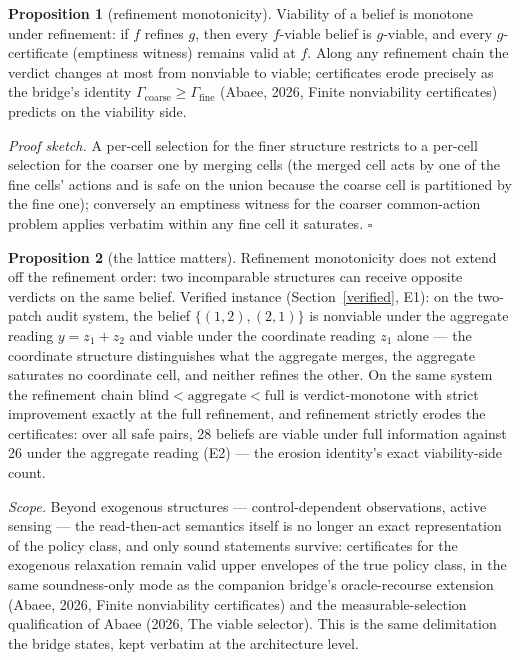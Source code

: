 \documentclass[10pt,twocolumn]{article}
\theoremstyle{definition}
\newtheorem{proposition}{Proposition}
\begin{document}
\begin{proposition}[refinement monotonicity]\label{prop:mono}
Viability of a belief is monotone under refinement: if \(f\) refines
\(g\), then every \(f\)-viable belief is \(g\)-viable, and every
\(g\)-certificate (emptiness witness) remains valid at \(f\). Along any
refinement chain the verdict changes at most from nonviable to viable;
certificates erode precisely as the bridge's identity
\(\Gamma_{\mathrm{coarse}} \ge \Gamma_{\mathrm{fine}}\) (Abaee, 2026, Finite nonviability certificates)
predicts on the viability side.
\end{proposition}

\emph{Proof sketch.} A per-cell selection for the finer structure
restricts to a per-cell selection for the coarser one by merging cells
(the merged cell acts by one of the fine cells' actions and is safe on the
union because the coarse cell is partitioned by the fine one); conversely
an emptiness witness for the coarser common-action problem applies verbatim
within any fine cell it saturates. \hfill\(\square\)

\begin{proposition}[the lattice matters]\label{prop:lattice}
Refinement monotonicity does not extend off the refinement order: two
incomparable structures can receive opposite verdicts on the same belief.
Verified instance (Section~\ref{verified}, E1): on the two-patch audit
system, the belief \(\{(1,2), (2,1)\}\) is nonviable under the aggregate
reading \(y = z_{1} + z_{2}\) and viable under the coordinate reading
\(z_{1}\) alone --- the coordinate structure distinguishes what the
aggregate merges, the aggregate saturates no coordinate cell, and neither
refines the other. On the same system the refinement chain
\(\mathrm{blind} < \mathrm{aggregate} < \mathrm{full}\) is verdict-monotone
with strict improvement exactly at the full refinement, and refinement
strictly erodes the certificates: over all safe pairs, 28 beliefs are
viable under full information against 26 under the aggregate reading
(E2) --- the erosion identity's exact viability-side count.
\end{proposition}

\emph{Scope.} Beyond exogenous structures --- control-dependent
observations, active sensing --- the read-then-act semantics itself is no
longer an exact representation of the policy class, and only sound
statements survive: certificates for the exogenous relaxation remain valid
upper envelopes of the true policy class, in the same soundness-only mode
as the companion bridge's oracle-recourse extension (Abaee, 2026, Finite nonviability certificates) and the
measurable-selection qualification of Abaee (2026, The viable selector). This is the same
delimitation the bridge states, kept verbatim at the architecture level.
\end{document}
